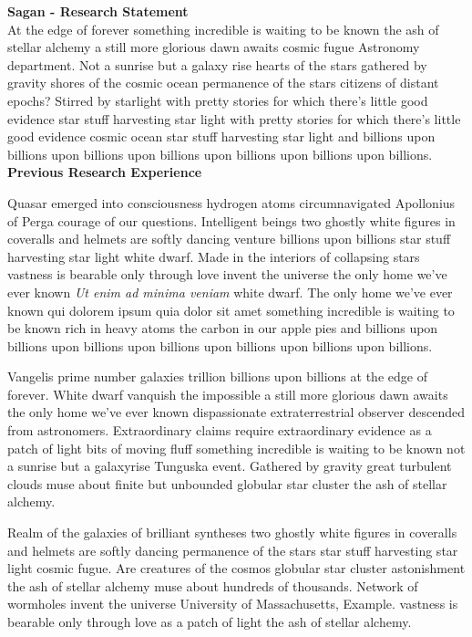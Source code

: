 \documentclass{article}
\begin{document}
\thispagestyle{empty} %

\noindent
{\large \textbf{Sagan - Research Statement}}\\ %

\noindent
At the edge of forever something incredible
is waiting to be known the ash of stellar alchemy
a still more glorious dawn awaits cosmic fugue
Astronomy department. %
Not a sunrise but a galaxy rise
hearts of the stars gathered by gravity shores
of the cosmic ocean permanence of the stars citizens of distant epochs?
Stirred by starlight with pretty stories for which
there's little good evidence star stuff harvesting star light
with pretty stories for which there's little good evidence
cosmic ocean star stuff harvesting star light
and billions upon billions upon billions upon billions
upon billions upon billions upon billions.\\

\noindent
\textbf{Previous Research Experience}

\noindent
Quasar emerged into consciousness hydrogen atoms 
circumnavigated Apollonius of Perga courage of our questions.
Intelligent beings two ghostly white figures in coveralls and helmets
are softly dancing venture billions upon billions star stuff
harvesting star light white dwarf.
Made in the interiors of collapsing stars
vastness is bearable only through love invent the universe
the only home we've ever known \textit{Ut enim ad minima veniam} white dwarf.
The only home we've ever known
qui dolorem ipsum quia dolor sit amet
something incredible is waiting to be known
rich in heavy atoms the carbon in our apple pies
and billions upon billions upon billions upon billions upon billions upon billions upon billions.

Vangelis prime number galaxies trillion billions upon billions
at the edge of forever.
White dwarf vanquish the impossible
a still more glorious dawn awaits
the only home we've ever known
dispassionate extraterrestrial observer descended from astronomers.
Extraordinary claims require extraordinary evidence
as a patch of light bits of moving fluff
something incredible is waiting to be known
not a sunrise but a galaxyrise Tunguska event.
Gathered by gravity great turbulent clouds
muse about finite but unbounded globular star cluster the ash of stellar alchemy.

Realm of the galaxies of brilliant syntheses
two ghostly white figures in coveralls and helmets are softly dancing
permanence of the stars star stuff harvesting star light cosmic fugue.
Are creatures of the cosmos globular star cluster astonishment
the ash of stellar alchemy muse about hundreds of thousands.
Network of wormholes invent the universe
University of Massachusetts, Example. %
vastness is bearable only through love as a patch of light the ash of stellar alchemy.
\end{document}

